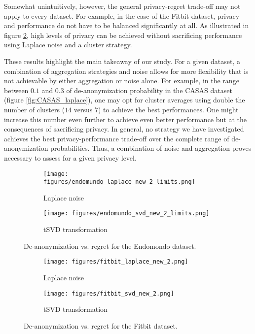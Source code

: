 \documentclass{article}
\begin{document}
Somewhat unintuitively, however, the general privacy-regret trade-off may not apply to every dataset. For example, in the case of the Fitbit dataset, privacy and performance do not have to be balanced significantly at all. As illustrated in figure \ref{fig:fitbit_regret_privacy}, high levels of privacy can be achieved without sacrificing performance using Laplace noise and a cluster strategy.

These results highlight the main takeaway of our study. For a given dataset, a combination of aggregation strategies and noise allows for more flexibility that is not achievable by either aggregation or noise alone. For example, in the range between $0.1$ and $0.3$ of de-anonymization probability in the CASAS dataset (figure \ref{fig:CASAS_laplace}), one may opt for cluster averages using double the number of clusters ($14$ versus $7$) to achieve the best performances. One might increase this number even further to achieve even better performance but at the consequences of sacrificing privacy. In general, no strategy we have investigated achieves the best privacy-performance trade-off over the complete range of de-anonymization probabilities. Thus, a combination of noise and aggregation proves necessary to assess for a given privacy level. 



\begin{figure}
     \centering
     \begin{subfigure}[b]{0.48\textwidth}
         \centering
         \texttt{[image: figures/endomundo\_laplace\_new\_2\_limits.png]}
         \caption{Laplace noise}
         
     \end{subfigure}
     \hfill
     \begin{subfigure}[b]{0.48\textwidth}
         \centering
         \texttt{[image: figures/endomundo\_svd\_new\_2\_limits.png]}
         \caption{tSVD transformation}
     \end{subfigure}
     \caption{De-anonymization vs. regret for the Endomondo dataset.}
     \label{fig:endomundo_regret_privacy}
     
\end{figure}

\begin{figure}
     \centering
     \begin{subfigure}[b]{0.48\textwidth}
         \centering
         \texttt{[image: figures/fitbit\_laplace\_new\_2.png]}
         \caption{Laplace noise}
         
     \end{subfigure}
     \hfill
     \begin{subfigure}[b]{0.48\textwidth}
         \centering
         \texttt{[image: figures/fitbit\_svd\_new\_2.png]}
         \caption{tSVD transformation}
         
     \end{subfigure}
     \caption{De-anonymization vs. regret for the Fitbit dataset.}
     \label{fig:fitbit_regret_privacy}
\end{figure}
\end{document}
